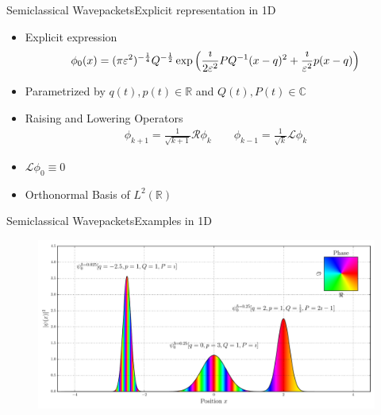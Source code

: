 \documentclass{beamer}
\begin{document}
\begin{frame}{Semiclassical Wavepackets}{Explicit representation in 1D}
  \begin{itemize}
    \item Explicit expression
    {\scriptsize
    \begin{align*}
      \phi_0(x) = (\pi\varepsilon^2)^{-\frac{1}{4}} Q^{-\frac{1}{2}}
                   \exp \left( \frac{\imath}{2\varepsilon^2} PQ{}^{-1} (x-q)^2 + \frac{\imath}{\varepsilon^2} p (x-q) \right)
    \end{align*}}
    \item Parametrized by $q(t), p(t) \in \mathbb{R}$ and $Q(t), P(t) \in \mathbb{C}$
    \item Raising and Lowering Operators
    \begin{align*}
      \phi_{k+1} = \frac{1}{\sqrt{k+1}} \mathcal{R} \phi_k
      \qquad
      \phi_{k-1} = \frac{1}{\sqrt{k}} \mathcal{L} \phi_k
    \end{align*}
    \item $\mathcal{L} \phi_0 \equiv 0$
    \item Orthonormal Basis of $L^2(\mathbb{R})$
  \end{itemize}
\end{frame}


\begin{frame}{Semiclassical Wavepackets}{Examples in 1D}
  \begin{figure}
    \centering
    \includegraphics[width=\linewidth]{./fig/wavepackets.pdf}
  \end{figure}
\end{frame}
\end{document}
